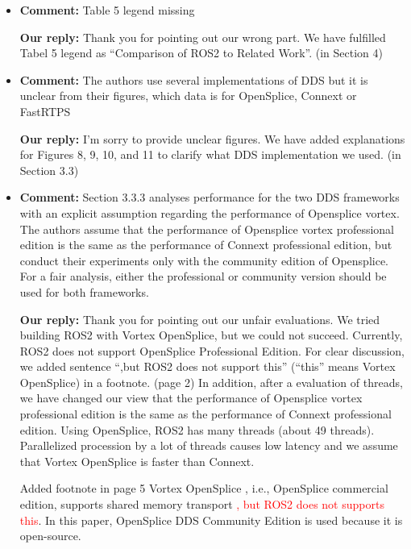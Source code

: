 \documentclass{article}
\begin{document}
\begin{itemize}
\item \begin{flushleft}
    \textbf{Comment:} Table 5 legend missing
  \end{flushleft}

  \begin{flushleft}
    \textbf{Our reply:} Thank you for pointing out our wrong part. We have fulfilled Tabel 5 legend as ``Comparison of ROS2 to Related Work''. (in Section 4)
  \end{flushleft}

\item \begin{flushleft}
    \textbf{Comment:} The authors use several implementations of DDS but it is unclear from their figures, which data is for OpenSplice, Connext or FastRTPS
  \end{flushleft}

  \begin{flushleft}
    \textbf{Our reply:} I'm sorry to provide unclear figures. We have added explanations for Figures 8, 9, 10, and 11 to clarify what DDS implementation we used. (in Section 3.3)
  \end{flushleft}

\item \begin{flushleft}
    \textbf{Comment:} Section 3.3.3 analyses performance for the two DDS frameworks with an explicit assumption regarding the performance of Opensplice vortex. The authors assume that the performance of Opensplice vortex professional edition is the same as the performance of Connext professional edition, but conduct their experiments only with the community edition of Opensplice. For a fair analysis, either the professional or community version should be used for both frameworks.
  \end{flushleft}

  \begin{flushleft}
    \textbf{Our reply:} Thank you for pointing out our unfair evaluations. 
    We tried building ROS2 with Vortex OpenSplice, but we could not succeed. 
    Currently, ROS2 does not support OpenSplice Professional Edition. For clear discussion, we added sentence ``,but ROS2 does not support this'' (``this'' means Vortex OpenSplice) in a footnote. (page 2) 
    In addition, after a evaluation of threads, we have changed our view that the performance of Opensplice vortex professional edition is the same as the performance of Connext professional edition. 
    Using OpenSplice, ROS2 has many threads (about 49 threads). 
    Parallelized procession by a lot of threads causes low latency and we assume that Vortex OpenSplice is faster than Connext.
  \end{flushleft}
  \begin{itembox}[|]{Added footnote in page 5}
    Vortex OpenSplice \cite{ospl_vortex}, i.e., OpenSplice commercial edition, supports shared memory transport \textcolor{red}{, but ROS2 does not supports this}. In this paper, OpenSplice DDS Community Edition is used because it is open-source.
  \end{itembox}\\


\end{itemize}
\end{document}
